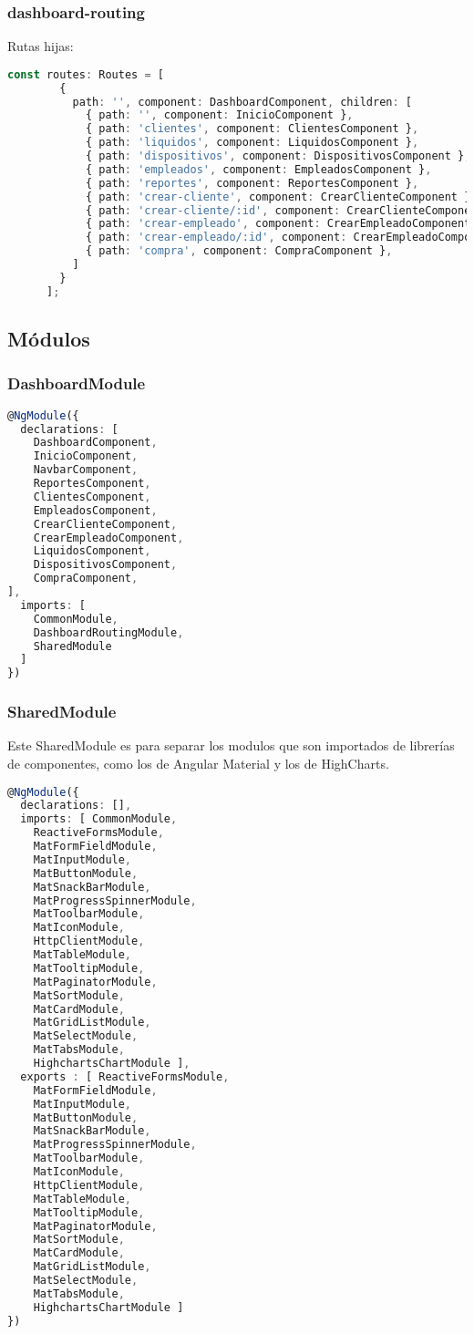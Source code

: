 \documentclass[a4paper]{article} %
\begin{document}
\subsubsection{dashboard-routing}
Rutas hijas:
\begin{lstlisting}[language=Typescript]
	const routes: Routes = [
		{
		  path: '', component: DashboardComponent, children: [
			{ path: '', component: InicioComponent },
			{ path: 'clientes', component: ClientesComponent },
			{ path: 'liquidos', component: LiquidosComponent },
			{ path: 'dispositivos', component: DispositivosComponent },
			{ path: 'empleados', component: EmpleadosComponent },
			{ path: 'reportes', component: ReportesComponent },
			{ path: 'crear-cliente', component: CrearClienteComponent },
			{ path: 'crear-cliente/:id', component: CrearClienteComponent },
			{ path: 'crear-empleado', component: CrearEmpleadoComponent },
			{ path: 'crear-empleado/:id', component: CrearEmpleadoComponent },
			{ path: 'compra', component: CompraComponent },
		  ]
		}
	  ];
\end{lstlisting}\clearpage
\subsection{Módulos}
\subsubsection{DashboardModule}
\begin{lstlisting}[language=Typescript]
	@NgModule({
  declarations: [
    DashboardComponent,
    InicioComponent,
    NavbarComponent,
    ReportesComponent,
    ClientesComponent,
    EmpleadosComponent,
    CrearClienteComponent,
    CrearEmpleadoComponent,
    LiquidosComponent,
    DispositivosComponent,
    CompraComponent,
],
  imports: [
    CommonModule,
    DashboardRoutingModule,
    SharedModule
  ]
})
\end{lstlisting}
\subsubsection{SharedModule}
Este SharedModule es para separar los modulos que son importados de librerías de componentes, como
los de Angular Material y los de HighCharts.
\begin{lstlisting}[language=Typescript]
	@NgModule({
  declarations: [],
  imports: [ CommonModule,
    ReactiveFormsModule,
    MatFormFieldModule,
    MatInputModule,
    MatButtonModule,
    MatSnackBarModule,
    MatProgressSpinnerModule,
    MatToolbarModule,
    MatIconModule,
    HttpClientModule,
    MatTableModule,
    MatTooltipModule,
    MatPaginatorModule,
    MatSortModule,
    MatCardModule,
    MatGridListModule,
    MatSelectModule,
    MatTabsModule,
    HighchartsChartModule ],
  exports : [ ReactiveFormsModule,
    MatFormFieldModule,
    MatInputModule,
    MatButtonModule,
    MatSnackBarModule,
    MatProgressSpinnerModule,
    MatToolbarModule,
    MatIconModule,
    HttpClientModule,
    MatTableModule,
    MatTooltipModule,
    MatPaginatorModule,
    MatSortModule,
    MatCardModule,
    MatGridListModule,
    MatSelectModule,
    MatTabsModule,
    HighchartsChartModule ]
})
\end{lstlisting}\clearpage
\end{document}
